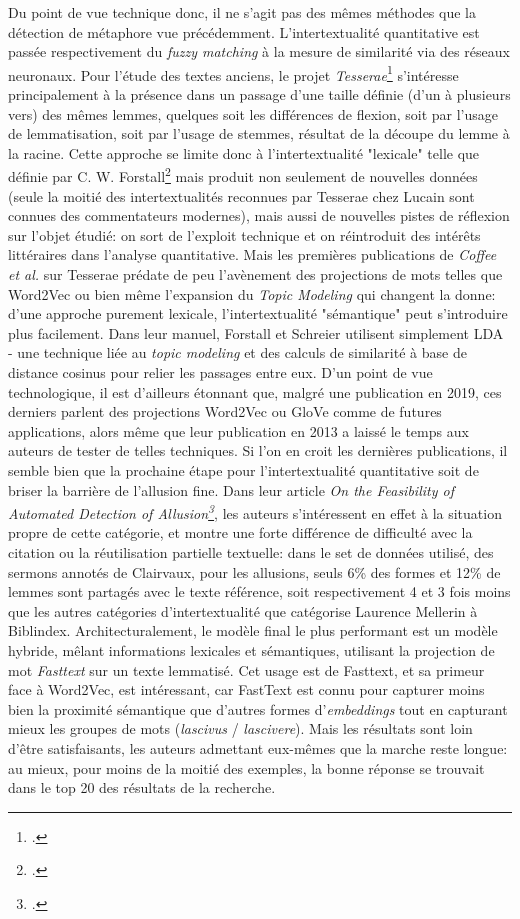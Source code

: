 Du point de vue technique donc, il ne s'agit pas des mêmes méthodes que la détection de métaphore vue précédemment. L'intertextualité quantitative est passée respectivement du \textit{fuzzy matching} à la mesure de similarité via des réseaux neuronaux. Pour l'étude des textes anciens, le projet \textit{Tesserae}\footcite{coffee_tesserae_2013} s'intéresse principalement à la présence dans un passage d'une taille définie (d'un à plusieurs vers) des mêmes lemmes, quelques soit les différences de flexion, soit par l'usage de lemmatisation, soit par l'usage de stemmes, résultat de la découpe du lemme à la racine. Cette approche se limite donc à l'intertextualité "lexicale" telle que définie par C. W. Forstall\footcite{forstall_quantitative_2019} mais produit non seulement de nouvelles données (seule la moitié des intertextualités reconnues par Tesserae chez Lucain sont connues des commentateurs modernes), mais aussi de nouvelles pistes de réflexion sur l'objet étudié: on sort de l'exploit technique et on réintroduit des intérêts littéraires dans l'analyse quantitative. Mais les premières publications de \textit{Coffee et al.} sur Tesserae prédate de peu l'avènement des projections de mots telles que Word2Vec ou bien même l'expansion du \textit{Topic Modeling} qui changent la donne: d'une approche purement lexicale, l'intertextualité "sémantique" peut s'introduire plus facilement. Dans leur manuel, Forstall et Schreier utilisent simplement LDA - une technique liée au \textit{topic modeling} et des calculs de similarité à base de distance cosinus pour relier les passages entre eux. D'un point de vue technologique, il est d'ailleurs étonnant que, malgré une publication en 2019, ces derniers parlent des projections Word2Vec ou GloVe comme de futures applications, alors même que leur publication en 2013 a laissé le temps aux auteurs de tester de telles techniques. Si l'on en croit les dernières publications, il semble bien que la prochaine étape pour l'intertextualité quantitative soit de briser la barrière de l'allusion fine. Dans leur article \textit{On the Feasibility of Automated Detection of Allusion\footcite{manjavacas_feasibility_2019}}, les auteurs s'intéressent en effet à la situation propre de cette catégorie, et montre une forte différence de difficulté avec la citation ou la réutilisation partielle textuelle: dans le set de données utilisé, des sermons annotés de Clairvaux, pour les allusions, seuls 6\% des formes et 12\% de lemmes sont partagés avec le texte référence, soit respectivement 4 et 3 fois moins que les autres catégories d'intertextualité que catégorise Laurence Mellerin à Biblindex. Architecturalement, le modèle final le plus performant est un modèle hybride, mêlant informations lexicales et sémantiques, utilisant la projection de mot \textit{Fasttext} sur un texte lemmatisé. Cet usage est de Fasttext, et sa primeur face à Word2Vec, est intéressant, car FastText est connu pour capturer moins bien la proximité sémantique que d'autres formes d'\textit{embeddings} tout en capturant mieux les groupes de mots (\textit{lascivus} / \textit{lascivere}). Mais les résultats sont loin d'être satisfaisants, les auteurs admettant eux-mêmes que la marche reste longue: au mieux, pour moins de la moitié des exemples, la bonne réponse se trouvait dans le top 20 des résultats de la recherche. 


